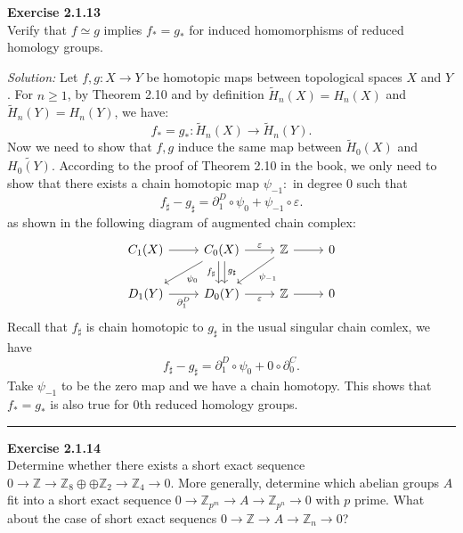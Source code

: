 \documentclass[a4paper, 11pt]{article}
\newenvironment{problem}[2][Exercise]
    { \begin{mdframed}[backgroundcolor=gray!20] \textbf{#1 #2} \\}
    {  \end{mdframed}}
\newenvironment{solution}
    {\textit{Solution:}}
    {}
\begin{document}
\begin{problem}{2.1.13}
Verify that \(f\simeq g\) implies \(f_*=g_*\) for induced homomorphisms of reduced homology groups.
\end{problem}
\begin{solution}
Let \(f,g:X\rightarrow Y\) be homotopic maps between topological spaces \(X\) and \(Y\). For \(n\geq 1\), by Theorem 2.10 and by definition \(\tilde{H}_n(X)=H_n(X)\) and 
\(\tilde{H}_n(Y)=H_n(Y)\), we have:
$$f_*=g_*:\tilde{H}_n(X)\rightarrow \tilde{H}_n(Y).$$
Now we need to show that \(f,g\) induce the same map between \(\tilde{H}_0(X)\) and \(\tilde{H_0(Y)}\). According to the proof of Theorem 2.10 in the book, we only need to show that 
there exists a chain homotopic map \(\psi_{-1}:\) in degree 0 such that 
$$f_\sharp-g_\sharp=\partial_1^D\circ \psi_0+\psi_{-1}\circ \varepsilon.$$
as shown in the following diagram of augmented chain complex:
$$\begin{tikzcd}
	{C_1(X)} & {C_0(X)} & {\mathbb{Z}} & 0 \\
	{D_1(Y)} & {D_0(Y)} & {\mathbb{Z}} & 0
	\arrow[from=1-1, to=1-2]
	\arrow["\varepsilon", from=1-2, to=1-3]
	\arrow["{\psi_0}", from=1-2, to=2-1]
	\arrow["{f_\sharp}"', shift right, from=1-2, to=2-2]
	\arrow["{g_\sharp}", shift left, from=1-2, to=2-2]
	\arrow[from=1-3, to=1-4]
	\arrow["{\psi_{-1}}", from=1-3, to=2-2]
	\arrow["{\partial_1^D}"', from=2-1, to=2-2]
	\arrow["\varepsilon"', from=2-2, to=2-3]
	\arrow[from=2-3, to=2-4]
\end{tikzcd}$$
Recall that \(f_\sharp\) is chain homotopic to \(g_\sharp\) in the usual singular chain comlex, we have 
$$f_\sharp-g_\sharp=\partial_1^D\circ \psi_0+0\circ \partial_0^C.$$
Take \(\psi_{-1}\) to be the zero map and we have a chain homotopy. This shows that \(f_*=g_*\) is also true for \(0\)th reduced homology groups.

\end{solution}
\noindent\rule{7in}{2.8pt}
\begin{problem}{2.1.14}
Determine whether there exists a short exact sequence \(0\rightarrow \mathbb{Z}\rightarrow \mathbb{Z}_8\oplus \oplus \mathbb{Z}_2\rightarrow \mathbb{Z}_4\rightarrow 0\). 
More generally, determine which abelian groups \(A\) fit into a short exact sequence \(0\rightarrow \mathbb{Z}_{p^m}\rightarrow A\rightarrow \mathbb{Z}_{p^n}\rightarrow 0\) with 
\(p\) prime. What about the case of short exact sequencs \(0\rightarrow \mathbb{Z}\rightarrow A\rightarrow \mathbb{Z}_n\rightarrow 0\)?
\end{problem}
\end{document}
